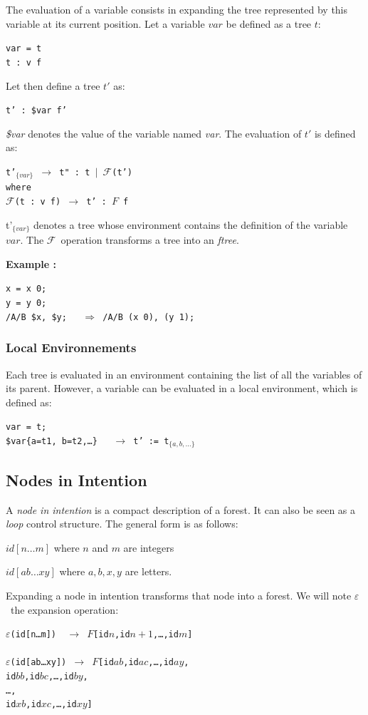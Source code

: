 \documentclass{article}
\newcommand{\exemple}	{\vspace*{1mm}\hspace*{-4mm}\textbf{Example :}}
\newcommand{\code}	[2][0.9]		{\vspace{0mm}\begin{center}\colorbox{mygrey}{
							\begin{minipage}[t]{#1\columnwidth} 
							{\small \texttt{#2}}
							\end{minipage}}\end{center}}
\newcommand{\op}	[1]		{\vspace{0mm}\begin{center}\colorbox{mygrey}{
							\begin{minipage}[t]{0.9\columnwidth} 
							{\small \texttt{#1}}
							\end{minipage}}\end{center}}
\newcommand{\seq}		{\ensuremath{|}}
\newcommand{\foret}		{\ensuremath{F}}
\newcommand{\toforet}	{\ensuremath{\mathcal{F}}}
\newcommand{\ftree}		{ftree}
\newcommand{\etc}		{…}
\newcommand{\nexpand}	{\ensuremath{\varepsilon}}
\newcommand{\ulc}		{\hspace*{37mm}}
\begin{document}
The evaluation of a variable consists in expanding the tree represented by this variable at its current position.
Let a variable $var$ be defined as a tree $t$:
\op{var = t \\
t :  v f
}
Let then define a tree $t'$ as:
\op{t' :  \$var f'}
\emph{\$var} denotes the value of the variable named \emph{var}. The evaluation of $t'$ is defined as:
\op{t'$_{\{var\}}$  $\to$ t" : t \seq\ \toforet(t') \\
where \\
\toforet(t : v f) $\to$ t' : \foret\ f
}
t'$_{\{var\}}$ denotes a tree whose environment contains the definition of the variable $var$. The \toforet\ operation transforms a tree into an \emph{\ftree}.


\exemple
\code{x = x 0;\\
y = y 0;\\
/A/B \$x, \$y; \ \ $\Rightarrow$  /A/B (x 0), (y 1);}


\subsubsection{Local Environnements}

Each tree is evaluated in an environment containing the list of all the variables of its parent. However, a variable can be evaluated in a local environment, which is defined as:
\code{var = t;\\
\$var\{a=t1, b=t2,\etc\} \ \ $\to$  t' := t$_{\{a, b,\etc\}}$}



\subsection{Nodes in Intention}

A \emph{node in intention} is a compact description of a forest. It can also be seen as a \emph{loop} control structure. The general form is as follows:
\begin{description}
 \setlength\itemsep{0.0em}
\item $id[n…m]$ 	where $n$ and $m$ are integers
\item $id[ab…xy]$ where $a,b,x,y$ are letters.
\end{description}

Expanding a node in intention transforms that node into a forest. We will note \nexpand\ the expansion operation:
\code{\nexpand(id[n…m]) \ $\to$ \foret [id$n$,id$n+1$,…,id$m$]\\
\\
\nexpand(id[ab…xy]) $\to$ \foret [id$ab$,id$ac$,…,id$ay$,\\
\ulc id$bb$,id$bc$,…,id$by$,\\
\ulc …,\\
\ulc id$xb$,id$xc$,…,id$xy$]
}
\end{document}
